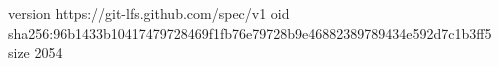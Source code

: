 version https://git-lfs.github.com/spec/v1
oid sha256:96b1433b10417479728469f1fb76e79728b9e46882389789434e592d7c1b3ff5
size 2054
